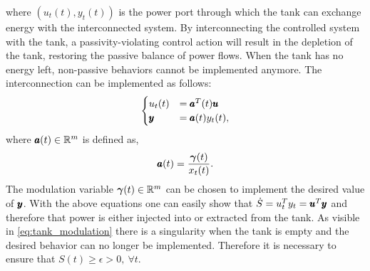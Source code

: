 where $(u_t(t), y_t(t))$ is the power port through which the tank can exchange energy with the interconnected system. By interconnecting the controlled system with the tank, a passivity-violating control action will result in the depletion of the tank, restoring the passive balance of power flows. When the tank has no energy left, non-passive behaviors cannot be implemented anymore. The interconnection can be implemented as follows:
\begin{equation}
\begin{cases}
    u_t(t) &= \pmb{a}^T(t) \pmb{u} \\
    \pmb{y} &= \pmb{a}(t) y_t(t),
\end{cases}
\end{equation}
where $\pmb{a}(t) \in \mathbb{R}^{m}$ is defined as,
\begin{equation} \label{eq:tank_modulation}
    \pmb{a}(t) = \frac{\boldsymbol{\gamma}(t)}{x_t(t)}.
\end{equation}
The modulation variable $\boldsymbol{\gamma}(t) \in \mathbb{R}^{m}$ can be chosen to implement the desired value of $\pmb{y}$. With the above equations one can easily show that $\dot{S} = u_t^T y_t = \pmb{u}^T \pmb{y}$ and therefore that power is either injected into or extracted from the tank. As visible in \eqref{eq:tank_modulation} there is a singularity when the tank is empty and the desired behavior can no longer be implemented. 
Therefore it is necessary to ensure that $S(t) \geq \epsilon > 0, \ \forall t$.